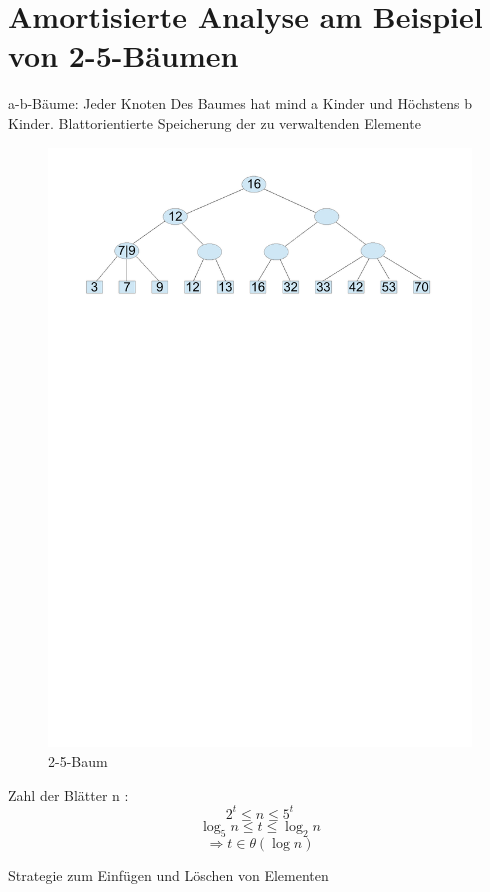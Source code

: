 \documentclass[a4paper,twoside,10pt]{report}
\begin{document}
\section{Amortisierte Analyse am Beispiel von 2-5-Bäumen}
a-b-Bäume: Jeder Knoten Des Baumes hat mind a Kinder und Höchstens b Kinder.
Blattorientierte Speicherung der zu verwaltenden Elemente
\begin{figure}[H]\center
\includegraphics[trim= 1.8cm 20cm 2cm 1.3cm,clip,width=\columnwidth]{figures/aa25baum.pdf}
\caption{2-5-Baum}
\end{figure}
Zahl der Blätter n :
\[2^t\le n\le 5^t\]
\[\log_5n \le t\le  \log_2n\]
\[\Rightarrow t\in \theta (\log n)\]

Strategie zum Einfügen und Löschen von Elementen
\end{document}
